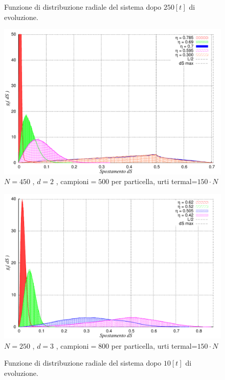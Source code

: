 \documentclass[11pt]{article}
\theoremstyle{plain}
\theoremstyle{remark}
\begin{document}
\begin{figure}[htbp]
\centering
		\caption[Sfere Rigide$/$Problema5\_2.cpp]{Funzione di distribuzione radiale del sistema dopo $250[t]$ di evoluzione.}\vspace{-15pt}
		\includegraphics[scale=1]{Immagini/Rigide/DistrodS_2D}
		\newline \footnotesize{$N= 450$ , $d=2$ , campioni$= 500$ per particella,  urti termal=$ 150 \cdot N$}
	\label{fig: DistrodS_2D}

\centering
	\caption[Sfere Rigide$/$Problema7\_2.cpp]{Funzione di distribuzione radiale del sistema dopo $10[t]$ di evoluzione.}\vspace{-15pt}
	\includegraphics[scale=1]{Immagini/Rigide/DistrodS_3D}
	\newline \footnotesize{$N= 250$ , $d=3$ , campioni$= 800$ per particella,  urti termal=$ 150 \cdot N$}
	\label{fig: DistrodS_3D}
\end{figure}
\end{document}
